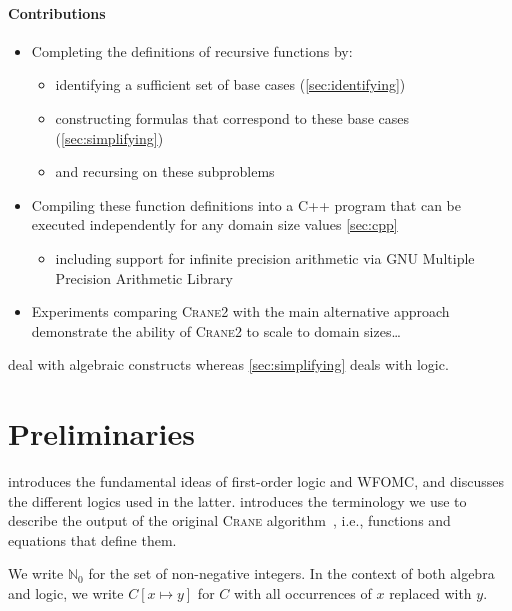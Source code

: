 \documentclass{article}
\theoremstyle{definition}
\newcommand{\Cranetwo}{\textsc{Crane2}}
\begin{document}

\paragraph{Contributions}
\begin{itemize}
  \item Completing the definitions of recursive functions by:
  \begin{itemize}
    \item identifying a sufficient set of base cases (\cref{sec:identifying})
    \item constructing formulas that correspond to these base cases
          (\cref{sec:simplifying})
    \item and recursing on these subproblems
  \end{itemize}
  \item Compiling these function definitions into a C++ program that can be
        executed independently for any domain size values \cref{sec:cpp}
        \begin{itemize}
          \item including support for infinite precision arithmetic via GNU
                Multiple Precision Arithmetic Library
        \end{itemize}
  \item Experiments comparing \Cranetwo{} with the main alternative approach
        demonstrate the ability of \Cranetwo{} to scale to domain sizes\dots
\end{itemize}

 deal with algebraic constructs whereas
\cref{sec:simplifying} deals with logic.

\section{Preliminaries}

 introduces the fundamental ideas of first-order logic and
WFOMC, and discusses the different logics used in the latter.\@
{} introduces the terminology we use to describe the output of
the original \textsc{Crane} algorithm~\cite{DBLP:conf/kr/DilkasB23}, i.e.,
functions and equations that define them.

We write $\mathbb{N}_{0}$ for the set of non-negative integers. In the context
of both algebra and logic, we write $C[x \mapsto y]$ for $C$ with all
occurrences of $x$ replaced with $y$.
\end{document}
